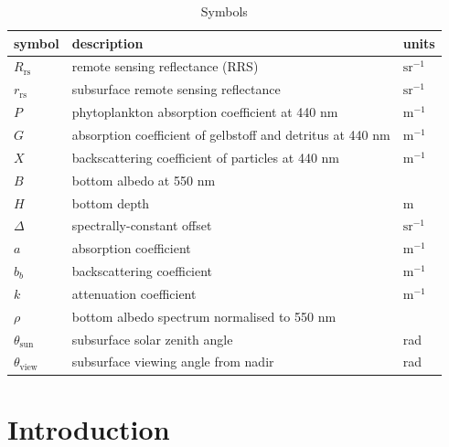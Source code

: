 \documentclass[12pt]{article}
\numberwithin{equation}{section}
\begin{document}
\begin{table}[H]
\centering
\caption{Symbols}
{\small
\begin{tabular}{ l l l }
 symbol & description & units \\
 \hline
 $R_{\text{rs}}$ & remote sensing reflectance (RRS) & $\text{sr}^{-1}$ \\
 $r_{\text{rs}}$ & subsurface remote sensing reflectance & $\text{sr}^{-1}$ \\  
 $P$ & phytoplankton absorption coefficient at 440 nm & $\text{m}^{-1}$ \\
 $G$ & absorption coefficient of gelbstoff and detritus at 440 nm & $\text{m}^{-1}$ \\
 $X$ & backscattering coefficient of particles at 440 nm & $\text{m}^{-1}$ \\
 $B$ & bottom albedo at 550 nm & \\
 $H$ & bottom depth & m \\
 $\Delta$ & spectrally-constant offset & $\text{sr}^{-1}$ \\
 $a$ & absorption coefficient & $\text{m}^{-1}$ \\
 $b_b$ & backscattering coefficient & $\text{m}^{-1}$ \\
 $k$ & attenuation coefficient & $\text{m}^{-1}$ \\
 $\rho$ & bottom albedo spectrum normalised to 550 nm & \\
 $\theta_{\text{sun}}$ & subsurface solar zenith angle & rad \\
 $\theta_{\text{view}}$ & subsurface viewing angle from nadir & rad \\
 \hline
\end{tabular}
}
\end{table}

\section{Introduction}
\end{document}
